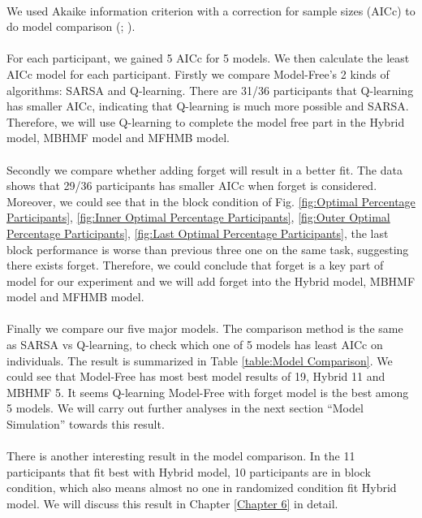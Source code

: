 \paragraph{}
We used Akaike information criterion with a correction for sample sizes (AICc) to do model comparison (\cite{akaike1974new}; \cite{bucci1998removal}). 
\paragraph{}
For each participant, we gained 5 AICc for 5 models. We then calculate the least AICc model for each participant. Firstly we compare Model-Free's 2 kinds of algorithms: SARSA and Q-learning. There are 31/36 participants that Q-learning has smaller AICc, indicating that Q-learning is much more possible and SARSA. Therefore, we will use Q-learning to complete the model free part in the Hybrid model, MBHMF model and MFHMB model. 
\paragraph{}
Secondly we compare whether adding forget will result in a better fit. The data shows that 29/36 participants has smaller AICc when forget is considered. Moreover, we could see that in the block condition of Fig. \ref{fig:Optimal Percentage Participants}, \ref{fig:Inner Optimal Percentage Participants}, \ref{fig:Outer Optimal Percentage Participants}, \ref{fig:Last Optimal Percentage Participants}, the last block performance is worse than previous three one on the same task, suggesting there exists forget. Therefore, we could conclude that forget is a key part of model for our experiment and we will add forget into the Hybrid model, MBHMF model and MFHMB model. 
\paragraph{}
Finally we compare our five major models. The comparison method is the same as SARSA vs Q-learning, to check which one of 5 models has least AICc on individuals. The result is summarized in Table \ref{table:Model Comparison}. We could see that Model-Free has most best model results of 19, Hybrid 11 and MBHMF 5. It seems Q-learning Model-Free with forget model is the best among 5 models. We will carry out further analyses in the next section \enquote{Model Simulation} towards this result. 
\paragraph{}
There is another interesting result in the model comparison. In the 11 participants that fit best with Hybrid model, 10 participants are in block condition, which also means almost no one in randomized condition fit Hybrid model. We will discuss this result in Chapter \ref{Chapter 6} in detail. 

